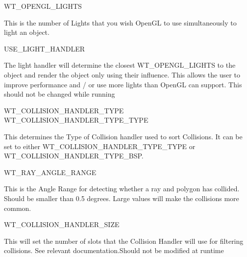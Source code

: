 \begin{DoxyItemize}
\item WT\_\-OPENGL\_\-LIGHTS
\begin{DoxyItemize}
\item This is the number of Lights that you wish OpenGL to use simultaneously to light an object.
\end{DoxyItemize}
\end{DoxyItemize}
\begin{DoxyItemize}
\item USE\_\-LIGHT\_\-HANDLER
\begin{DoxyItemize}
\item The light handler will determine the closest WT\_\-OPENGL\_\-LIGHTS to the object and render the object only using their influence. This allows the user to improve performance and / or use more lights than OpenGL can support. This should not be changed while running
\end{DoxyItemize}
\end{DoxyItemize}
\begin{DoxyItemize}
\item WT\_\-COLLISION\_\-HANDLER\_\-TYPE WT\_\-COLLISION\_\-HANDLER\_\-TYPE\_\-TYPE
\begin{DoxyItemize}
\item This determines the Type of Collision handler used to sort Collisions. It can be set to either WT\_\-COLLISION\_\-HANDLER\_\-TYPE\_\-TYPE or WT\_\-COLLISION\_\-HANDLER\_\-TYPE\_\-BSP.
\end{DoxyItemize}
\end{DoxyItemize}
\begin{DoxyItemize}
\item WT\_\-RAY\_\-ANGLE\_\-RANGE
\begin{DoxyItemize}
\item This is the Angle Range for detecting whether a ray and polygon has collided. Should be smaller than 0.5 degrees. Large values will make the collisions more common.
\end{DoxyItemize}
\end{DoxyItemize}
\begin{DoxyItemize}
\item WT\_\-COLLISION\_\-HANDLER\_\-SIZE
\begin{DoxyItemize}
\item This will set the number of slots that the Collision Handler will use for filtering collisions. See relevant documentation.Should not be modified at runtime
\end{DoxyItemize}
\end{DoxyItemize}
